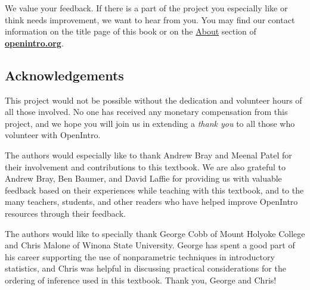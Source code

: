 
We value your feedback. If there is a part of the project you especially like or think needs improvement, we want to hear from you. You may find our contact information on the title page of this book or on the \href{http://www.openintro.org/about.php}{About} section of \href{http://www.openintro.org}{\color{black}\textbf{openintro.org}}.

\subsection*{Acknowledgements}

This project would not be possible without the dedication and volunteer hours of all those involved. No one has received any monetary compensation from this project, and we hope you will join us in extending a \emph{thank you} to all those who volunteer with OpenIntro.

The authors would especially like to thank Andrew Bray and Meenal Patel for their involvement and contributions to this textbook. We are also grateful to Andrew Bray, Ben Baumer, and David Laffie for providing us with valuable feedback based on their experiences while teaching with this textbook, and to the many teachers, students, and other readers who have helped improve OpenIntro resources through their feedback.

The authors would like to specially thank George Cobb of Mount Holyoke College and Chris Malone of Winona State University. George has spent a good part of his career supporting the use of nonparametric techniques in introductory statistics, and Chris was helpful in discussing practical considerations for the ordering of inference used in this textbook. Thank you, George and Chris!

